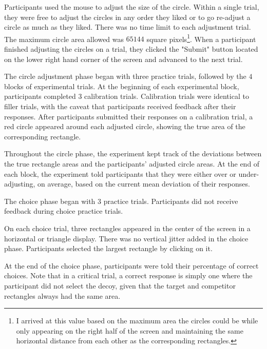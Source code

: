 Participants used the mouse to adjust the size of the circle. Within a single trial, they were free to adjust the circles in any order they liked or to go re-adjust a circle as much as they liked. There was no time limit to each adjustment trial. The maximum circle area allowed was $65144$ square pixels\footnote{I arrived at this value based on the maximum area the circles could be while only appearing on the right half of the screen and maintaining the same horizontal distance from each other as the corresponding rectangles.}. When a participant finished adjusting the circles on a trial, they clicked the "Submit" button located on the lower right hand corner of the screen and advanced to the next trial. 

The circle adjustment phase began with three practice trials, followed by the $4$ blocks of experimental trials. At the beginning of each experimental block, participants completed $3$ calibration trials. Calibration trials were identical to filler trials, with the caveat that participants received feedback after their responses. After participants submitted their responses on a calibration trial, a red circle appeared around each adjusted circle, showing the true area of the corresponding rectangle. 

Throughout the circle phase, the experiment  kept track of the deviations between the true rectangle areas and the participants' adjusted circle areas. At the end of each block, the experiment told participants that they were either over or under-adjusting, on average, based on the current mean deviation of their responses.

The choice phase began with $3$ practice trials. Participants did not receive feedback during choice practice trials. 

On each choice trial, three rectangles appeared in the center of the screen in a horizontal or triangle display. There was no vertical jitter added in the choice phase. Participants selected the largest rectangle by clicking on it.

At the end of the choice phase, participants were told their percentage of correct choices. Note that in a critical trial, a correct response is simply one where the participant did not select the decoy, given that the target and competitor rectangles always had the same area.

